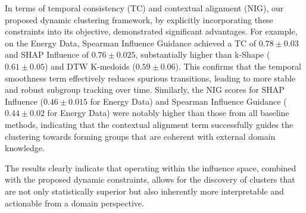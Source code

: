 \documentclass[final,authoryear,3p,times,review,sort&compress]{elsarticle}
\begin{document}
In terms of temporal consistency (TC) and contextual alignment (NIG), our proposed dynamic clustering framework, by explicitly incorporating these constraints into its objective, demonstrated significant advantages. For example, on the Energy Data, Spearman Influence Guidance achieved a TC of $0.78 \pm 0.03$ and SHAP Influence of $0.76 \pm 0.025$, substantially higher than k-Shape ($0.61 \pm 0.05$) and DTW K-medoids ($0.59 \pm 0.06$). This confirms that the temporal smoothness term effectively reduces spurious transitions, leading to more stable and robust subgroup tracking over time. Similarly, the NIG scores for SHAP Influence ($0.46 \pm 0.015$ for Energy Data) and Spearman Influence Guidance ($0.44 \pm 0.02$ for Energy Data) were notably higher than those from all baseline methods, indicating that the contextual alignment term successfully guides the clustering towards forming groups that are coherent with external domain knowledge.

The results clearly indicate that operating within the influence space, combined with the proposed dynamic constraints, allows for the discovery of clusters that are not only statistically superior but also inherently more interpretable and actionable from a domain perspective.
\end{document}
